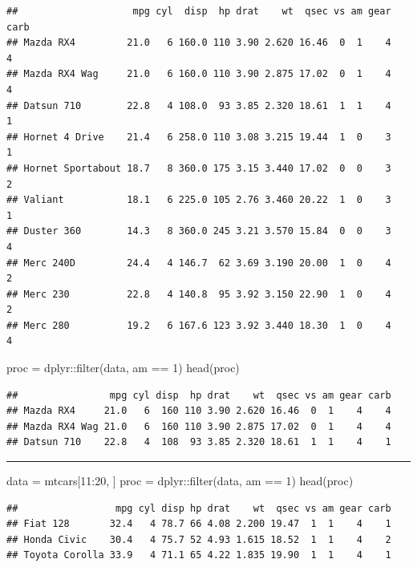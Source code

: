 \documentclass[
]{article}
\newenvironment{Shaded}{\begin{snugshade}}{\end{snugshade}}
\newcommand{\DecValTok}[1]{\textcolor[rgb]{0.00,0.00,0.81}{#1}}
\newcommand{\FunctionTok}[1]{\textcolor[rgb]{0.00,0.00,0.00}{#1}}
\newcommand{\NormalTok}[1]{#1}
\newcommand{\OtherTok}[1]{\textcolor[rgb]{0.56,0.35,0.01}{#1}}
\newcommand{\SpecialCharTok}[1]{\textcolor[rgb]{0.00,0.00,0.00}{#1}}
\begin{document}
\begin{verbatim}
##                    mpg cyl  disp  hp drat    wt  qsec vs am gear carb
## Mazda RX4         21.0   6 160.0 110 3.90 2.620 16.46  0  1    4    4
## Mazda RX4 Wag     21.0   6 160.0 110 3.90 2.875 17.02  0  1    4    4
## Datsun 710        22.8   4 108.0  93 3.85 2.320 18.61  1  1    4    1
## Hornet 4 Drive    21.4   6 258.0 110 3.08 3.215 19.44  1  0    3    1
## Hornet Sportabout 18.7   8 360.0 175 3.15 3.440 17.02  0  0    3    2
## Valiant           18.1   6 225.0 105 2.76 3.460 20.22  1  0    3    1
## Duster 360        14.3   8 360.0 245 3.21 3.570 15.84  0  0    3    4
## Merc 240D         24.4   4 146.7  62 3.69 3.190 20.00  1  0    4    2
## Merc 230          22.8   4 140.8  95 3.92 3.150 22.90  1  0    4    2
## Merc 280          19.2   6 167.6 123 3.92 3.440 18.30  1  0    4    4
\end{verbatim}

\begin{Shaded}
\begin{Highlighting}[]
\NormalTok{proc }\OtherTok{=}\NormalTok{ dplyr}\SpecialCharTok{::}\FunctionTok{filter}\NormalTok{(data, am }\SpecialCharTok{==} \DecValTok{1}\NormalTok{)}
\FunctionTok{head}\NormalTok{(proc)}
\end{Highlighting}
\end{Shaded}

\begin{verbatim}
##                mpg cyl disp  hp drat    wt  qsec vs am gear carb
## Mazda RX4     21.0   6  160 110 3.90 2.620 16.46  0  1    4    4
## Mazda RX4 Wag 21.0   6  160 110 3.90 2.875 17.02  0  1    4    4
## Datsun 710    22.8   4  108  93 3.85 2.320 18.61  1  1    4    1
\end{verbatim}

\begin{center}\rule{0.5\linewidth}{0.5pt}\end{center}

\begin{Shaded}
\begin{Highlighting}[]
\NormalTok{data }\OtherTok{=}\NormalTok{ mtcars[}\DecValTok{11}\SpecialCharTok{:}\DecValTok{20}\NormalTok{, ]}
\NormalTok{proc }\OtherTok{=}\NormalTok{ dplyr}\SpecialCharTok{::}\FunctionTok{filter}\NormalTok{(data, am }\SpecialCharTok{==} \DecValTok{1}\NormalTok{)}
\FunctionTok{head}\NormalTok{(proc)}
\end{Highlighting}
\end{Shaded}

\begin{verbatim}
##                 mpg cyl disp hp drat    wt  qsec vs am gear carb
## Fiat 128       32.4   4 78.7 66 4.08 2.200 19.47  1  1    4    1
## Honda Civic    30.4   4 75.7 52 4.93 1.615 18.52  1  1    4    2
## Toyota Corolla 33.9   4 71.1 65 4.22 1.835 19.90  1  1    4    1
\end{verbatim}
\end{document}
